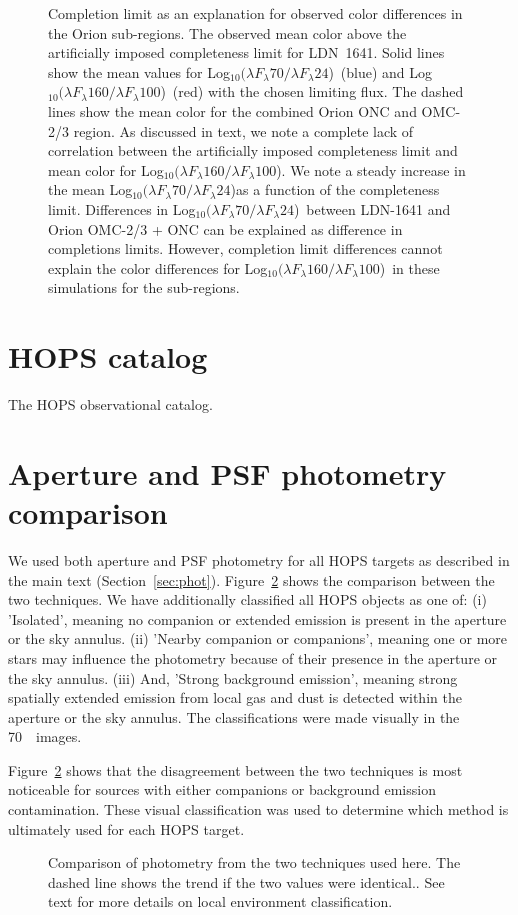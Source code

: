 \documentclass[manuscript]{aastex61}
\newcommand{\clra}{Log$_{10}(\lambda F_\lambda70/\lambda F_\lambda24$)}
\newcommand{\clrb}{Log$_{10}(\lambda F_\lambda160/\lambda F_\lambda100$)}
\begin{document}
\begin{figure}[ht]
\centering
{}
\caption{Completion limit as an explanation for observed color differences in the Orion sub-regions.  The observed mean color above the artificially imposed completeness limit for LDN~1641.  Solid lines show the mean values for \clra\ (blue) and \clrb\ (red) with the chosen limiting flux.  The dashed lines show the mean color for the combined Orion ONC and OMC-2/3 region.  As discussed in text, we note a complete lack of correlation between the artificially imposed completeness limit and mean color for \clrb.  We note a steady increase in the mean \clra as a function of the completeness limit.  Differences in \clra\ between LDN-1641 and Orion OMC-2/3 + ONC can be explained as difference in completions limits.  However, completion limit differences cannot explain the color differences for \clrb\ in these simulations for the sub-regions.\label{fig:clr_v_limit}}
\end{figure}

\appendix

\section{HOPS catalog}
\par
The HOPS observational catalog.


\section{Aperture and PSF photometry comparison}
\par
We used both aperture and PSF photometry for all HOPS targets as described in the main text (Section~\ref{sec:phot}).  Figure~\ref{fig:aper_psf_comp} shows the comparison between the two techniques.  We have additionally classified all HOPS objects as one of: (i) 'Isolated', meaning no companion or extended emission is present in the aperture or the sky annulus.  (ii) 'Nearby companion or companions', meaning one or more stars may influence the photometry because of their presence in the aperture or the sky annulus.  (iii) And, 'Strong background emission', meaning strong spatially extended emission from local gas and dust is detected within the aperture or the sky annulus.  The classifications were made visually in the 70~\micron\ images.
\par
Figure~\ref{fig:aper_psf_comp} shows that the disagreement between the two techniques is most noticeable for sources with either companions or background emission contamination.  These visual classification was used to determine which method is ultimately used for each HOPS target.
\begin{figure}[ht]
\centering
{}
\caption{Comparison of photometry from the two techniques used here. The dashed line shows the trend if the two values were identical.\label{fig:aper_psf_comp}.  See text for more details on local environment classification.}
\end{figure}
\end{document}

